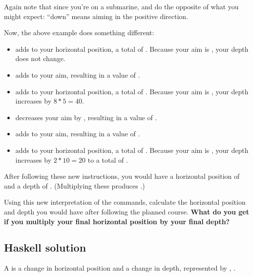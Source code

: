 Again note that since you're on a submarine, {\Tt{}\nwendquote} and {\Tt{}\nwendquote} do the opposite of what you might expect: ``down'' means aiming in the positive direction.

Now, the above example does something different:
\begin{itemize}
\item {\Tt{}\nwendquote} adds  to your horizontal position, a total of . Because your aim is , your depth does not change.
\item {\Tt{}\nwendquote} adds  to your aim, resulting in a value of .
\item {\Tt{}\nwendquote} adds  to your horizontal position, a total of . Because your aim is , your depth increases by $8*5=40$.
\item {\Tt{}\nwendquote} decreases your aim by , resulting in a value of .
\item {\Tt{}\nwendquote} adds  to your aim, resulting in a value of .
\item {\Tt{}\nwendquote} adds  to your horizontal position, a total of . Because your aim is , your depth increases by $2*10=20$ to a total of .
\end{itemize}

After following these new instructions, you would have a horizontal position of  and a depth of . (Multiplying these produces .)

Using this new interpretation of the commands, calculate the horizontal position and depth you would have after following the planned course. \textbf{What do you get if you multiply your final horizontal position by your final depth?}
\nwenddocs{}\newpage
\subsection{Haskell solution}

A {\Tt{}\nwendquote} is a change in horizontal position and a change in depth,
represented by , .

